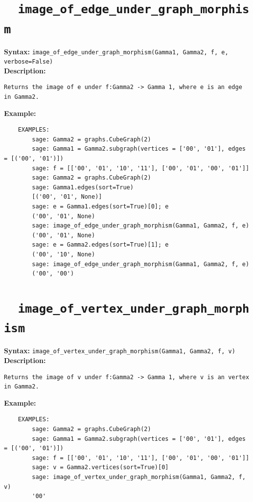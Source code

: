 \documentclass{article}
\begin{document}
\section{\tt \ \ image\_of\_edge\_under\_graph\_morphism}

\textbf{Syntax:} \verb}image_of_edge_under_graph_morphism(Gamma1, Gamma2, f, e, verbose=False)}\\

\textbf{Description:}
\begin{verbatim}
Returns the image of e under f:Gamma2 -> Gamma 1, where e is an edge in Gamma2.
\end{verbatim}

\textbf{Example:}
\begin{verbatim}
    EXAMPLES:
        sage: Gamma2 = graphs.CubeGraph(2)
        sage: Gamma1 = Gamma2.subgraph(vertices = ['00', '01'], edges = [('00', '01')])
        sage: f = [['00', '01', '10', '11'], ['00', '01', '00', '01']]
        sage: Gamma2 = graphs.CubeGraph(2)
        sage: Gamma1.edges(sort=True)
        [('00', '01', None)]
        sage: e = Gamma1.edges(sort=True)[0]; e
        ('00', '01', None)
        sage: image_of_edge_under_graph_morphism(Gamma1, Gamma2, f, e)
        ('00', '01', None)
        sage: e = Gamma2.edges(sort=True)[1]; e
        ('00', '10', None)
        sage: image_of_edge_under_graph_morphism(Gamma1, Gamma2, f, e)
        ('00', '00')
\end{verbatim}

\section{\tt \ \ image\_of\_vertex\_under\_graph\_morphism}

\textbf{Syntax:} \verb}image_of_vertex_under_graph_morphism(Gamma1, Gamma2, f, v)}\\

\textbf{Description:}
\begin{verbatim}
Returns the image of v under f:Gamma2 -> Gamma 1, where v is an vertex in Gamma2.
\end{verbatim}

\textbf{Example:}
\begin{verbatim}
    EXAMPLES:
        sage: Gamma2 = graphs.CubeGraph(2)
        sage: Gamma1 = Gamma2.subgraph(vertices = ['00', '01'], edges = [('00', '01')])
        sage: f = [['00', '01', '10', '11'], ['00', '01', '00', '01']]
        sage: v = Gamma2.vertices(sort=True)[0]
        sage: image_of_vertex_under_graph_morphism(Gamma1, Gamma2, f, v)
        '00'
\end{verbatim}
\end{document}
